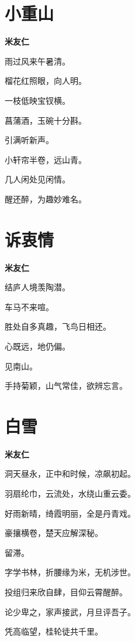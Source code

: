 \documentclass[12pt,a4paper]{ctexbook}
\begin{document}
\section{小重山}
\textbf{米友仁}\par\vspace{0.5em}
雨过风来午暑清。\par
榴花红照眼，向人明。\par
一枝低映宝钗横。\par
菖蒲酒，玉碗十分斟。\par
引满听新声。\par
小轩帘半卷，远山青。\par
几人闲处见闲情。\par
醒还醉，为趣妙难名。\par

\section{诉衷情}
\textbf{米友仁}\par\vspace{0.5em}
结庐人境羡陶潜。\par
车马不来喧。\par
胜处自多真趣，飞鸟日相还。\par
心既远，地仍偏。\par
见南山。\par
手持菊颖，山气常佳，欲辨忘言。\par

\section{白雪}
\textbf{米友仁}\par\vspace{0.5em}
洞天昼永，正中和时候，凉飙初起。\par
羽扇纶巾，云流处，水绕山重云委。\par
好雨新晴，绮霞明丽，全是丹青戏。\par
豪攘横卷，楚天应解深秘。\par
留滞。\par
字学书林，折腰缘为米，无机涉世。\par
投组归来欣自肆，目仰云霄醒醉。\par
论少卑之，家声接武，月旦评吾子。\par
凭高临望，桂轮徒共千里。\par
\end{document}
